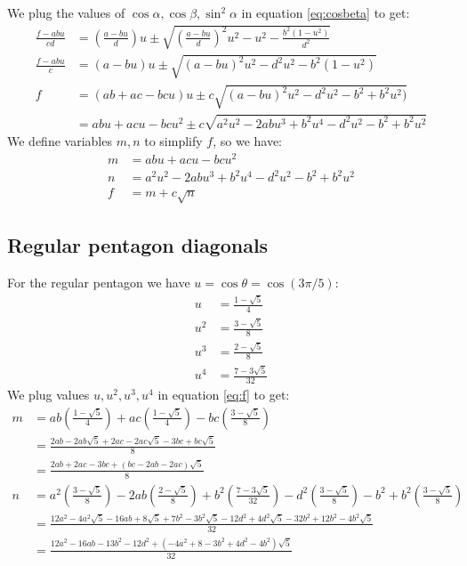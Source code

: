 \documentclass[11pt]{article}
\begin{document}
We plug the values of $\cos\alpha, \cos\beta, \sin^2\alpha$ in equation \ref{eq:cosbeta} to get:
\begin{align}
\frac{f - abu}{cd} &= \left(\frac{a - bu}{d}\right)u \pm \sqrt{
 \left(\frac{a - bu}{d}\right)^2u^2 - u^2 - \frac{b^2(1-u^2)}{d^2}
}\nonumber\\
\frac{f - abu}{c} &= (a - bu)u \pm \sqrt{(a-bu)^2u^2 - d^2u^2 - b^2(1-u^2)}\nonumber\\
f &= (ab + ac - bcu)u \pm c\sqrt{(a-bu)^2u^2 - d^2u^2 - b^2 +b^2u^2)}\nonumber\\
 &= abu + acu - bcu^2 \pm c\sqrt{a^2u^2 - 2abu^3 + b^2u^4- d^2u^2 - b^2 +b^2u^2 }
\end{align}
We define variables $m,n$ to simplify $f$, so we have:
\begin{align}
m &= abu + acu - bcu^2\\
n &= a^2u^2 - 2abu^3 + b^2u^4- d^2u^2 - b^2 +b^2u^2\\
f &= m + c\sqrt{n}  \label{eq:f}
\end{align}

\subsection{Regular pentagon diagonals}

For the regular pentagon we have $u = \cos\theta = \cos(3\pi/5)$:
\begin{align}
u &= \frac{1-\sqrt{5}}{4}\\
u^2 &= \frac{3-\sqrt{5}}{8}\\
u^3 &= \frac{2-\sqrt{5}}{8}\\
u^4 &= \frac{7-3\sqrt{5}}{32}
\end{align}
We plug values $u,u^2,u^3,u^4$ in equation \ref{eq:f} to get:
\begin{align}
m &= ab\left(\frac{1-\sqrt{5}}{4}\right)
 + ac\left(\frac{1-\sqrt{5}}{4}\right)
 - bc\left(\frac{3-\sqrt{5}}{8}\right)\nonumber\\
 &= \frac{2ab - 2ab\sqrt{5} + 2ac - 2ac\sqrt{5} - 3bc + bc\sqrt{5}}{8}\nonumber\\
 &= \frac{2ab + 2ac - 3bc + (bc -2ab - 2ac)\sqrt{5}}{8}\\
%
n &= a^2\left(\frac{3-\sqrt{5}}{8}\right)
 - 2ab\left(\frac{2-\sqrt{5}}{8}\right)
 + b^2\left(\frac{7-3\sqrt{5}}{32}\right)
 - d^2\left(\frac{3-\sqrt{5}}{8}\right)
 - b^2
 + b^2\left(\frac{3-\sqrt{5}}{8}\right)\nonumber\\
 &= \frac{
 12a^2 - 4a^2\sqrt{5}
 -16ab+8\sqrt{5}
 +7b^2-3b^2\sqrt{5}
 -12d^2+4d^2\sqrt{5}
 -32b^2
 +12b^2-4b^2\sqrt{5}
 }{32}\nonumber\\
 &= \frac{12a^2 - 16ab - 13b^2 - 12d^2 + (-4a^2 + 8 - 3b^2 + 4d^2 - 4b^2)\sqrt{5}}{32}
\end{align}
\end{document}
